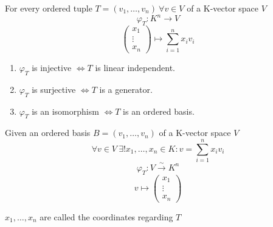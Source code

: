 \begin{proposition}
   For every ordered tuple \(T = (v_1, \ldots, v_n)~\forall v \in V\) of a K-vector space \(V\)
   \[\varphi_{T}: K^n \to V\]
   \[\begin{pmatrix} x_1 \\ \vdots \\ x_n \end{pmatrix} \mapsto \sum_{i=1}^n x_i v_i\]

   \begin{enumerate}
      \item \(\varphi_T\) is injective \(\iff T\) is linear independent.
      \item \(\varphi_T\) is surjective \(\iff T\) is a generator.
      \item \(\varphi_T\) is an isomorphism \(\iff T\) is an ordered basis.
   \end{enumerate}
\end{proposition}

\begin{corollary}
   Given an ordered basis \(B = (v_1, \ldots, v_n)\) of a K-vector space \(V\)
   \[\forall v \in V~\exists! x_1, \ldots, x_n \in K: v = \sum_{i=1}^n x_i v_i\]
   \[\varphi_{T}: V \xrightarrow{\sim} K^n\]
   \[v \mapsto \begin{pmatrix} x_1 \\ \vdots \\ x_n \end{pmatrix}\]
\end{corollary}
\begin{remark}
   \(x_1, \ldots, x_n\) are called the coordinates regarding \(T\)
\end{remark}

